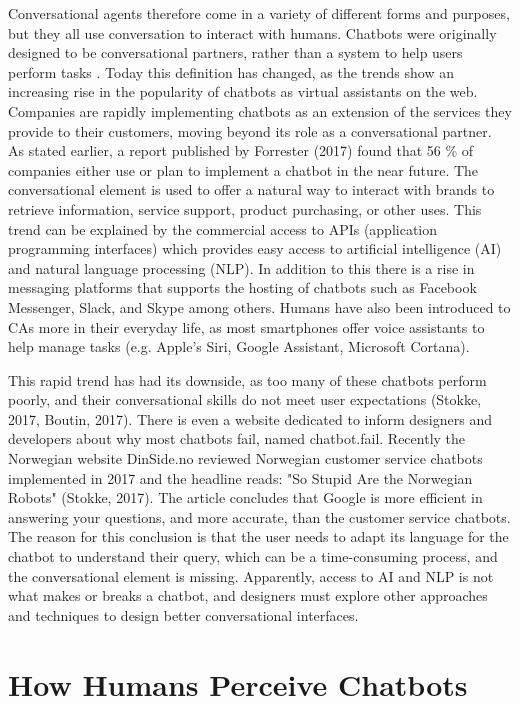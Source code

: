 Conversational agents therefore come in a variety of different forms and purposes, but they all use conversation to interact with humans. Chatbots were originally designed to be conversational partners, rather than a system to help users perform tasks \citep{McTear2016}. Today this definition has changed, as the trends show an increasing rise in the popularity of chatbots as virtual assistants on the web. Companies are rapidly implementing chatbots as an extension of the services they provide to their customers, moving beyond its role as a conversational partner. As stated earlier, a report published by Forrester (2017) found that 56 \% of companies either use or plan to implement a chatbot in the near future. The conversational element is used to offer a natural way to interact with brands to retrieve information, service support, product purchasing, or other uses. This trend can be explained by the commercial access to APIs (application programming interfaces) which provides easy access to artificial intelligence (AI) and natural language processing (NLP). In addition to this there is a rise in messaging platforms that supports the hosting of chatbots such as Facebook Messenger, Slack, and Skype among others. Humans have also been introduced to CAs more in their everyday life, as most smartphones offer voice assistants to help manage tasks (e.g. Apple's Siri, Google Assistant, Microsoft Cortana).

This rapid trend has had its downside, as too many of these chatbots perform poorly, and their conversational skills do not meet user expectations (Stokke, 2017, Boutin, 2017). There is even a website dedicated to inform designers and developers about why most chatbots fail, named chatbot.fail. Recently the Norwegian website DinSide.no reviewed Norwegian customer service chatbots implemented in 2017 and the headline reads: "So Stupid Are the Norwegian Robots" (Stokke, 2017). The article concludes that Google is more efficient in answering your questions, and more accurate, than the customer service chatbots. The reason for this conclusion is that the user needs to adapt its language for the chatbot to understand their query, which can be a time-consuming process, and the conversational element is missing. Apparently, access to AI and NLP is not what makes or breaks a chatbot, and designers must explore other approaches and techniques to design better conversational interfaces.

\section{How Humans Perceive Chatbots}

